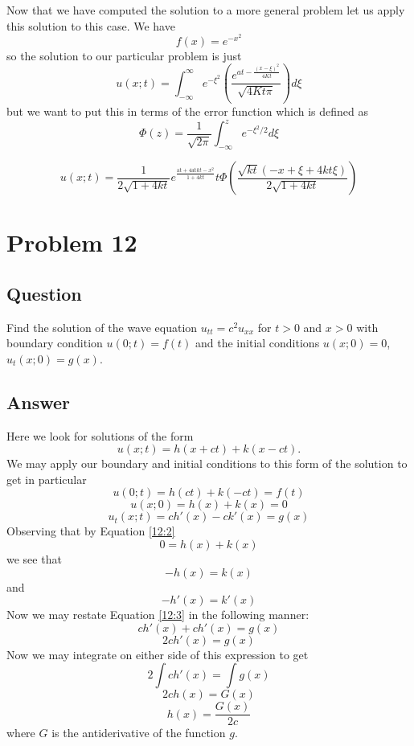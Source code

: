 \documentclass[12pt]{article}
\begin{document}
Now that we have computed the solution to a more general problem let us apply this solution to this case. We have 
\[f(x)=e^{-x^2}\]
so the solution to our particular problem is just
\[u(x;t)=\int_{-\infty}^\infty e^{-\xi^2} \left( \frac{e^{at-\frac{(x-\xi)^2}{4Kt}}}{\sqrt{4 K t \pi}} \right) d \xi \]
but we want to put this in terms of the error function which is defined as 
\[\Phi(z) = \frac{1}{\sqrt{2 \pi}} \int_{-\infty}^z e^{-\xi^2 /2} d \xi \]

\[u(x;t)= \frac{1}{2 \sqrt{1+4 k t}}e^{\frac{\text{at}+4 \text{at} k t-x^2}{1+4 k t}} t \Phi \left(\frac{ \sqrt{k t} \left( -x+\xi+4  k t \xi \right)}{2  \sqrt{1+4 k t}}\right)\]


\section{Problem 12}
\subsection{Question}
Find the solution of the wave equation $u_{tt} = c^2 u_{xx}$ for $t>0$ and $x>0$ with boundary condition $u(0;t) = f(t)$ and the initial conditions $u(x;0) = 0$, $u_t(x;0) = g(x)$.

\subsection{Answer}

Here we look for solutions of the form
\[u(x;t)=h(x+ c t)+k(x-c t).\]
We may apply our boundary and initial conditions to this form of the solution to get in particular
\begin{equation}\label{12:1}u(0;t)=h( c t)+k(-c t) = f(t)\end{equation}
\begin{equation}\label{12:2}u(x;0)=h(x)+k(x) = 0\end{equation}
\begin{equation}\label{12:3}u_t(x;t)=c h'(x )-c k'(x) = g(x)\end{equation}
Observing that by Equation \ref{12:2} 
\[0=h(x)+k(x)\]
we see that
\[-h(x)=k(x)\]
and
\[-h'(x)=k'(x)\]
Now we may restate Equation \ref{12:3} in the following manner:
\[c h'(x )+c h'(x) = g(x)\]
\[2 c h'(x) = g(x)\]
Now we may integrate on either side of this expression to get
\[2 \int c h'(x) = \int g(x)\]
\[2 c  h(x) = G(x)\]
\begin{equation}\label{thisthing}  h(x) =\frac{ G(x)}{2 c}\end{equation}
where $G$ is the antiderivative of the function $g$.
\end{document}
